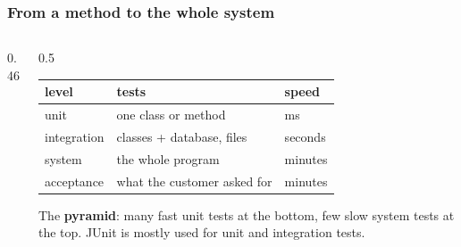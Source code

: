 \documentclass[aspectratio=169,10pt,compress]{beamer}
\begin{document}




\begin{frame}[t,fragile] \frametitle{From a method to the whole system}
  \begin{columns}[T]
    \begin{column}{0.46\textwidth}
      \begin{center}
      \end{center}
    \end{column}
    \begin{column}{0.5\textwidth}
      \begin{center}\small
      \begin{tabular}{lll}
        \toprule
        \textbf{level} & \textbf{tests}               & \textbf{speed} \\
        \midrule
        unit           & one class or method          & ms \\
        integration    & classes + database, files    & seconds \\
        system         & the whole program            & minutes \\
        acceptance     & what the customer asked for  & minutes \\
        \bottomrule
      \end{tabular}
      \end{center}
      \small The \textbf{pyramid}: many fast unit tests at the bottom, few slow system tests at the top.
      JUnit is mostly used for unit and integration tests.
    \end{column}
  \end{columns}
\end{frame}

\end{document}
